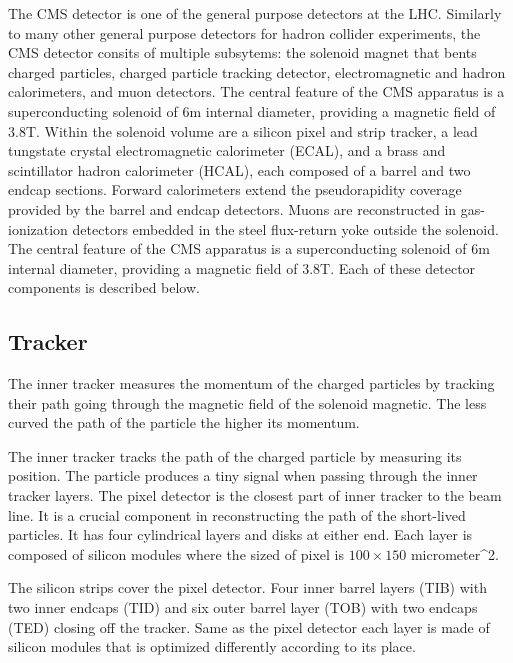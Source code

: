 The CMS detector is one of the general purpose detectors at the LHC.
%
Similarly to many other general purpose detectors for hadron collider experiments, the CMS detector consits of multiple subsytems:
the solenoid magnet that bents charged particles, charged particle tracking detector, electromagnetic and hadron calorimeters, and muon detectors.
The central feature of the CMS apparatus is a superconducting solenoid of 6\unit{m} internal diameter, providing a magnetic field of 3.8\unit{T}. Within the solenoid volume are a silicon pixel and strip tracker, a lead tungstate crystal electromagnetic calorimeter (ECAL), and a brass and scintillator hadron calorimeter (HCAL), each composed of a barrel and two endcap sections. Forward calorimeters extend the pseudorapidity coverage provided by the barrel and endcap detectors. Muons are reconstructed in gas-ionization detectors embedded in the steel flux-return yoke outside the solenoid.
The central feature of the CMS apparatus is a superconducting solenoid of 6\unit{m} internal diameter, providing a magnetic field of 3.8\unit{T}.
%
Each of these detector components is described below.

\subsection{Tracker}

The inner tracker measures the momentum of the charged particles by tracking their path going through the magnetic field of the solenoid magnetic. 
The less curved the path of the particle the higher its momentum.

The inner tracker tracks the path of the charged particle by measuring its position. The particle produces a tiny signal when passing through the inner tracker layers. 
The pixel detector is the closest part of inner tracker to the beam line. It is a crucial component in reconstructing the path of the short-lived particles. It has four cylindrical layers and disks at either end. Each layer is composed of silicon modules  where the sized of pixel is $100\times150$ micrometer^2. 

The silicon strips cover the pixel detector. Four inner barrel layers (TIB) with two inner endcaps (TID) and six outer barrel layer (TOB) with two endcaps (TED) closing off the tracker. Same as the pixel detector each layer is made of silicon modules that is optimized differently according to its place.

